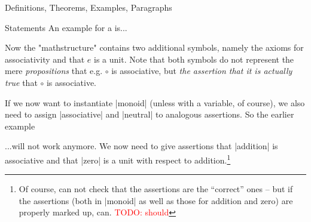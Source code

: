 \begin{sfragment}{Definitions, Theorems, Examples, Paragraphs}
\begin{smodule}{Statements}
{An example for a  is...
    }

    Now the \stexcode"mathstructure"  contains
    two additional symbols, namely the axioms for associativity
    and that $e$ is a unit. Note that both symbols do not
    represent the mere \emph{propositions} that e.g. 
    $\circ$ is associative, but \emph{the assertion that it is
    actually true} that $\circ$ is associative.
    
    If we now want to instantiate |monoid| (unless with a variable,
    of course), we also need to assign |associative| and |neutral|
    to analogous assertions. So the earlier example
    \begin{latexcode}[gobble=8]
    \end{latexcode}
    ...will not work anymore. We now need to give assertions that
    |addition| is associative and that |zero| is a unit with respect
    to addition.\footnote{Of course, \sTeX can not check that
    the assertions are the ``correct'' ones -- but if
    the assertions (both in |monoid| as well as those for addition and
    zero) are properly marked up, \mmt can. \textcolor{red}{TODO: should}}

\end{smodule}
\end{sfragment}

